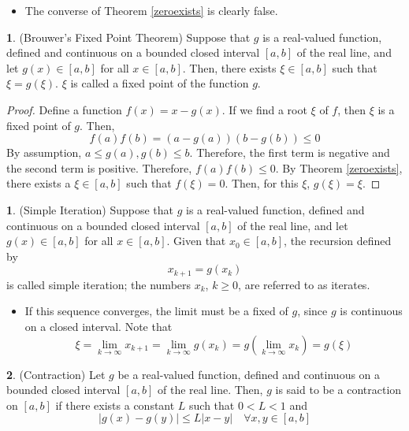 \documentclass[12pt]{article}
\theoremstyle{definition}
\newtheorem{definition}{\color{NavyBlue}{\textbf{Definition}}}
\newtheorem{theorem}{\color{ForestGreen}{\textbf{Theorem}}}
\theoremstyle{definition}
\begin{document}
\begin{itemize}
\item The converse of Theorem \ref{zeroexists} is clearly false.
\end{itemize}

\begin{theorem}(Brouwer's Fixed Point Theorem)
Suppose that $g$ is a real-valued function, defined and continuous on a bounded closed interval $[a,b]$ of the real line, and let $g(x) \in [a,b]$ for all $x \in [a,b]$. Then, there exists $\xi \in [a,b]$ such that $\xi = g(\xi)$. $\xi$ is called a fixed point of the function $g$. 
\end{theorem}
\begin{proof}
Define a function $f(x) = x - g(x)$. If we find a root $\xi$ of $f$, then $\xi$ is a fixed point of $g$. Then,
\begin{equation}
f(a)f(b) = (a - g(a))(b-g(b)) \leq 0
\end{equation}
By assumption, $a \leq g(a), g(b) \leq b$. Therefore, the first term is negative and the second term is positive. Therefore, $f(a)f(b) \leq 0$. By Theorem \ref{zeroexists}, there exists a $\xi \in [a,b]$ such that $f(\xi)=0$. Then, for this $\xi$, $g(\xi) = \xi$.
\end{proof}

\begin{definition}(Simple Iteration)
Suppose that $g$ is a real-valued function, defined and continuous on a bounded closed interval $[a,b]$ of the real line, and let $g(x) \in [a,b]$ for all $x \in [a,b]$. Given that $x_0 \in [a,b]$, the recursion defined by 
\begin{equation}
x_{k+1} = g(x_k)
\end{equation}
is called simple iteration; the numbers $x_k$, $k \geq 0$, are referred to as iterates.
\end{definition}

\begin{itemize}
\item If this sequence converges, the limit must be a fixed of $g$, since $g$ is continuous on a closed interval. Note that
\begin{equation}
\xi = \lim_{k \to \infty} x_{k+1} = \lim_{k \to \infty} g(x_k) = g\left( \lim_{k \to \infty} x_k \right) = g(\xi)
\end{equation}
\end{itemize}

\begin{definition}(Contraction)
Let $g$ be a real-valued function, defined and continuous on a bounded closed interval $[a,b]$ of the real line. Then, $g$ is said to be a contraction on $[a,b]$ if there exists a constant $L$ such that $0<L<1$ and 
\begin{equation}
|g(x)-g(y)| \leq L|x-y| \quad \forall x,y \in [a,b]
\end{equation}
\end{definition}
\end{document}
